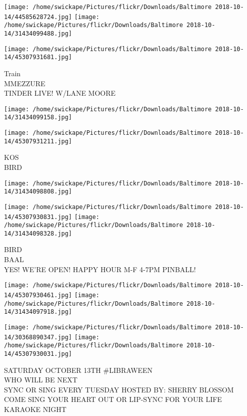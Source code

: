 \documentclass[10pt,letterpaper]{article}
\begin{document}
\texttt{[image: /home/swickape/Pictures/flickr/Downloads/Baltimore 2018-10-14/44585628724.jpg]}
\texttt{[image: /home/swickape/Pictures/flickr/Downloads/Baltimore 2018-10-14/31434099488.jpg]}

\texttt{[image: /home/swickape/Pictures/flickr/Downloads/Baltimore 2018-10-14/45307931681.jpg]}

Train\\
MMEZZURE\\
TINDER LIVE! W/LANE MOORE\\
\pagebreak

\texttt{[image: /home/swickape/Pictures/flickr/Downloads/Baltimore 2018-10-14/31434099158.jpg]}

\vspace{0.25in}
\texttt{[image: /home/swickape/Pictures/flickr/Downloads/Baltimore 2018-10-14/45307931211.jpg]}

KOS\\
BIRD\\
\pagebreak

\texttt{[image: /home/swickape/Pictures/flickr/Downloads/Baltimore 2018-10-14/31434098808.jpg]}

\vspace{0.25in}
\texttt{[image: /home/swickape/Pictures/flickr/Downloads/Baltimore 2018-10-14/45307930831.jpg]}
\texttt{[image: /home/swickape/Pictures/flickr/Downloads/Baltimore 2018-10-14/31434098328.jpg]}

BIRD\\
BAAL\\
YES!  WE'RE OPEN!  HAPPY HOUR M{-}F 4{-}7PM PINBALL!\\
\pagebreak

\texttt{[image: /home/swickape/Pictures/flickr/Downloads/Baltimore 2018-10-14/45307930461.jpg]}
\texttt{[image: /home/swickape/Pictures/flickr/Downloads/Baltimore 2018-10-14/31434097918.jpg]}

\texttt{[image: /home/swickape/Pictures/flickr/Downloads/Baltimore 2018-10-14/30368890347.jpg]}
\texttt{[image: /home/swickape/Pictures/flickr/Downloads/Baltimore 2018-10-14/45307930031.jpg]}

SATURDAY OCTOBER 13TH \#LIBRAWEEN\\
WHO WILL BE NEXT\\
SYNC OR SING EVERY TUESDAY HOSTED BY: SHERRY BLOSSOM COME SING YOUR HEART OUT OR LIP{-}SYNC FOR YOUR LIFE\\
KARAOKE NIGHT\\
\pagebreak
\end{document}
